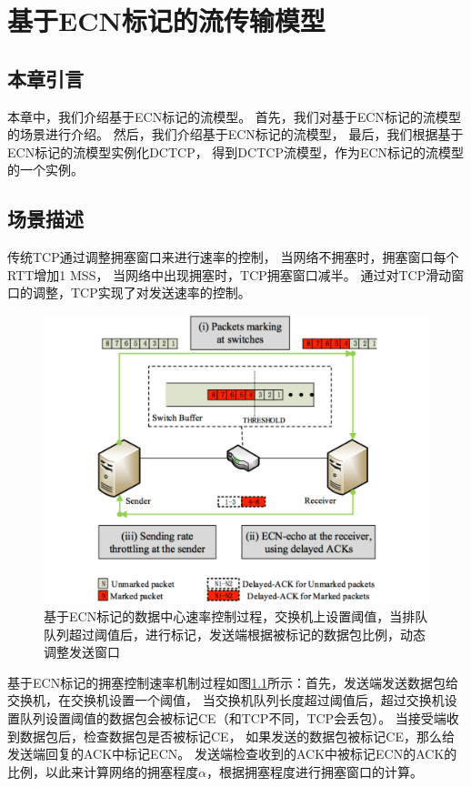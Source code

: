 \chapter{基于ECN标记的流传输模型}
\label{chap:model}

\section{本章引言}
本章中，我们介绍基于ECN标记的流模型。
首先，我们对基于ECN标记的流模型的场景进行介绍。
然后，我们介绍基于ECN标记的流模型，
最后，我们根据基于ECN标记的流模型实例化DCTCP，
得到DCTCP流模型，作为ECN标记的流模型的一个实例。

\section{场景描述}
传统TCP通过调整拥塞窗口来进行速率的控制，
当网络不拥塞时，拥塞窗口每个RTT增加1 MSS，
当网络中出现拥塞时，TCP拥塞窗口减半。
通过对TCP滑动窗口的调整，TCP实现了对发送速率的控制。

\begin{figure}[H] 
  \centering
  \includegraphics[width=0.9\columnwidth]{figures/others/model-process.pdf}
  \caption{基于ECN标记的数据中心速率控制过程，交换机上设置阈值，当排队队列超过阈值后，进行标记，发送端根据被标记的数据包比例，动态调整发送窗口}
  \label{model-process-fig}
\end{figure}

基于ECN标记的拥塞控制速率机制过程如图\ref{model-process-fig}所示：首先，发送端发送数据包给交换机，在交换机设置一个阈值，
当交换机队列长度超过阈值后，超过交换机设置队列设置阈值的数据包会被标记CE（和TCP不同，TCP会丢包）。
当接受端收到数据包后，检查数据包是否被标记CE，
如果发送的数据包被标记CE，那么给发送端回复的ACK中标记ECN。
发送端检查收到的ACK中被标记ECN的ACK的比例，以此来计算网络的拥塞程度$\alpha$，根据拥塞程度进行拥塞窗口的计算。

